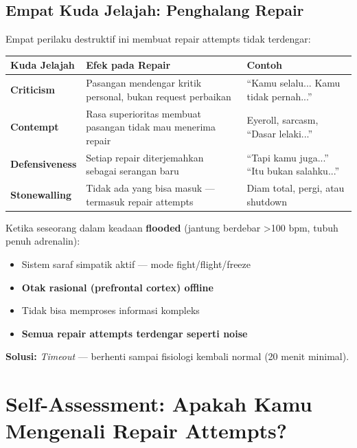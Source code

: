 \subsection{Empat Kuda Jelajah: Penghalang Repair}

Empat perilaku destruktif ini membuat repair attempts tidak terdengar:

\begin{center}
\renewcommand{\arraystretch}{1.5}
\begin{tabular}{|>{\raggedright}p{3cm}|>{\raggedright}p{6cm}|>{\raggedright\arraybackslash}p{6cm}|}
\hline
\rowcolor{accent!20}
\textbf{Kuda Jelajah} & \textbf{Efek pada Repair} & \textbf{Contoh} \\
\hline
\textbf{Criticism} & Pasangan mendengar kritik personal, bukan request perbaikan & ``Kamu selalu... Kamu tidak pernah...'' \\
\hline
\textbf{Contempt} & Rasa superioritas membuat pasangan tidak mau menerima repair & Eyeroll, sarcasm, ``Dasar lelaki...'' \\
\hline
\textbf{Defensiveness} & Setiap repair diterjemahkan sebagai serangan baru & ``Tapi kamu juga...'' ``Itu bukan salahku...'' \\
\hline
\textbf{Stonewalling} & Tidak ada yang bisa masuk --- termasuk repair attempts & Diam total, pergi, atau shutdown \\
\hline
\end{tabular}
\end{center}

\begin{warningbox}
Ketika seseorang dalam keadaan \textbf{flooded} (jantung berdebar >100 bpm, tubuh penuh adrenalin):
\begin{itemize}
    \item Sistem saraf simpatik aktif --- mode fight/flight/freeze
    \item \textbf{Otak rasional (prefrontal cortex) offline}
    \item Tidak bisa memproses informasi kompleks
    \item \textbf{Semua repair attempts terdengar seperti noise}
\end{itemize}

\textbf{Solusi:} \textit{Timeout} --- berhenti sampai fisiologi kembali normal (20 menit minimal).
\end{warningbox}

\section{Self-Assessment: Apakah Kamu Mengenali Repair Attempts?}

